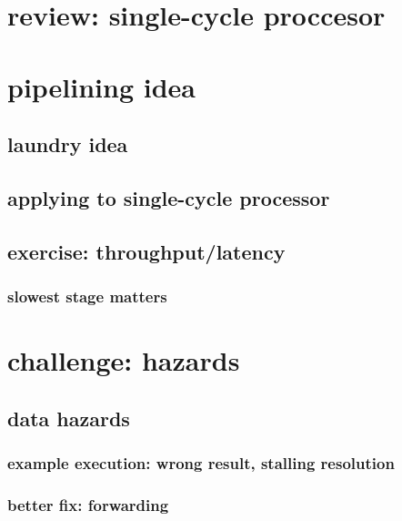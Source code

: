 
\section{review: single-cycle proccesor}



\section{pipelining idea}

\subsection{laundry idea}



\subsection{applying to single-cycle processor}


\subsection{exercise: throughput/latency}


\subsubsection{slowest stage matters}





\section{challenge: hazards}

\subsection{data hazards}

\subsubsection{example execution: wrong result, stalling resolution}


\subsubsection{better fix: forwarding}


